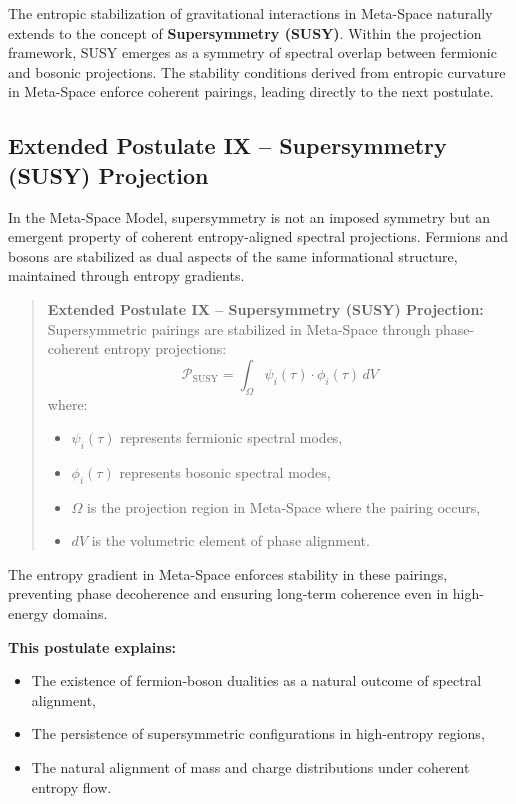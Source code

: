 \documentclass[10.5pt,a4paper]{article}
\begin{document}
The entropic stabilization of gravitational interactions in Meta-Space naturally extends to the concept of 
\textbf{Supersymmetry (SUSY)}. Within the projection framework, SUSY emerges as a symmetry of spectral 
overlap between fermionic and bosonic projections. The stability conditions derived from entropic curvature 
in Meta-Space enforce coherent pairings, leading directly to the next postulate.

\subsection{Extended Postulate IX – Supersymmetry (SUSY) Projection}

In the Meta-Space Model, supersymmetry is not an imposed symmetry but an emergent property of coherent 
entropy-aligned spectral projections. Fermions and bosons are stabilized as dual aspects of the same 
informational structure, maintained through entropy gradients.

\begin{quote}
\textbf{Extended Postulate IX – Supersymmetry (SUSY) Projection:}  
Supersymmetric pairings are stabilized in Meta-Space through phase-coherent entropy projections:
\[
\mathcal{P}_{\text{SUSY}} = \int_\Omega \psi_i(\tau) \cdot \phi_i(\tau) \, dV
\]
where:
\begin{itemize}
  \item \( \psi_i(\tau) \) represents fermionic spectral modes,
  \item \( \phi_i(\tau) \) represents bosonic spectral modes,
  \item \( \Omega \) is the projection region in Meta-Space where the pairing occurs,
  \item \( dV \) is the volumetric element of phase alignment.
\end{itemize}
\end{quote}

The entropy gradient in Meta-Space enforces stability in these pairings, preventing phase decoherence 
and ensuring long-term coherence even in high-energy domains.

\textbf{This postulate explains:}
\begin{itemize}
  \item The existence of fermion-boson dualities as a natural outcome of spectral alignment,
  \item The persistence of supersymmetric configurations in high-entropy regions,
  \item The natural alignment of mass and charge distributions under coherent entropy flow.
\end{itemize}
\end{document}
